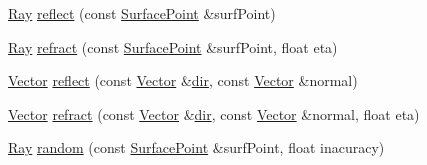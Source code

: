 \begin{DoxyCompactItemize}
\mbox{\hyperlink{class_ray}{Ray}} \mbox{\hyperlink{class_ray_ad3c0dfd18653aeb61735b3f720498dc8}{reflect}} (const \mbox{\hyperlink{class_surface_point}{Surface\+Point}} \&surf\+Point)
\item 
\mbox{\hyperlink{class_ray}{Ray}} \mbox{\hyperlink{class_ray_ab4723a206318cb11e98b487c324912df}{refract}} (const \mbox{\hyperlink{class_surface_point}{Surface\+Point}} \&surf\+Point, float eta)
\item 
\mbox{\hyperlink{struct_vector}{Vector}} \mbox{\hyperlink{class_ray_a411c500da66cd92a3a24807aba2015ae}{reflect}} (const \mbox{\hyperlink{struct_vector}{Vector}} \&\mbox{\hyperlink{class_ray_acfb8b7801f774b160fa51404dd65f2a5}{dir}}, const \mbox{\hyperlink{struct_vector}{Vector}} \&normal)
\item 
\mbox{\hyperlink{struct_vector}{Vector}} \mbox{\hyperlink{class_ray_a0f59bf2236d721bc337892989e9a6e4e}{refract}} (const \mbox{\hyperlink{struct_vector}{Vector}} \&\mbox{\hyperlink{class_ray_acfb8b7801f774b160fa51404dd65f2a5}{dir}}, const \mbox{\hyperlink{struct_vector}{Vector}} \&normal, float eta)
\item 
\mbox{\hyperlink{class_ray}{Ray}} \mbox{\hyperlink{class_ray_a6198c0a3ef332817bec5e8421a04cb31}{random}} (const \mbox{\hyperlink{class_surface_point}{Surface\+Point}} \&surf\+Point, float inacuracy)
\end{DoxyCompactItemize}
